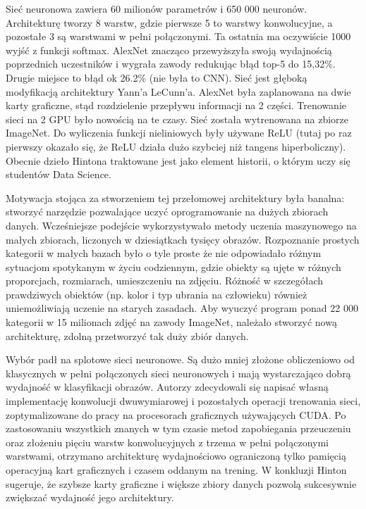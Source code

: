 \documentclass[12pt,a4paper,twoside,titlepage,openright]{book}
\begin{document}
\begin{itemize}
\begin{itemize}
 Sieć neuronowa zawiera 60 milionów parametrów i 650 000 neuronów. Architekturę tworzy 8 warstw, gdzie pierwsze 5 to warstwy konwolucyjne, a pozostałe 3 są warstwami w pełni połączonymi. Ta ostatnia ma oczywiście 1000 wyjść z funkcji softmax. AlexNet znacząco przewyższyła swoją wydajnością poprzednich uczestników i wygrała zawody redukując błąd top-5 do 15,32\%. Drugie miejsce to błąd ok 26.2\% (nie była to CNN). Sieć jest głęboką modyfikacją architektury Yann’a LeCunn’a. AlexNet była zaplanowana na dwie karty graficzne, stąd rozdzielenie przepływu informacji na 2 części. Trenowanie sieci na 2 GPU było nowością na te czasy. Sieć została wytrenowana na zbiorze ImageNet. Do wyliczenia funkcji nieliniowych były używane ReLU (tutaj po raz pierwszy okazało się, że ReLU działa dużo szybciej niż tangens hiperboliczny). Obecnie dzieło Hintona traktowane jest jako element historii, o którym uczy się studentów Data Science.
 
 Motywacja stojąca za stworzeniem tej przełomowej architektury była banalna: stworzyć narzędzie pozwalające uczyć oprogramowanie na dużych zbiorach danych.
 Wcześniejsze podejście wykorzystywało metody uczenia maszynowego na małych zbiorach, liczonych w dziesiątkach tysięcy obrazów. Rozpoznanie prostych kategorii w małych bazach było o tyle proste że nie odpowiadało różnym sytuacjom spotykanym w życiu codziennym, gdzie obiekty są ujęte w różnych proporcjach, rozmiarach, umieszczeniu na zdjęciu. Różność w szczegółach prawdziwych obiektów (np. kolor i typ ubrania na człowieku) również uniemożliwiają uczenie na starych zasadach. Aby wyuczyć program ponad 22 000 kategorii w 15 milionach zdjęć na zawody ImageNet, należało stworzyć nową architekturę, zdolną przetworzyć tak duży zbiór danych.
 
 Wybór padł na splotowe sieci neuronowe. Są dużo mniej złożone obliczeniowo od klasycznych w pełni połączonych sieci neuronowych i mają wystarczająco dobrą wydajność w klasyfikacji obrazów. Autorzy zdecydowali się napisać własną implementację konwolucji dwuwymiarowej i pozostałych operacji trenowania sieci, zoptymalizowane do pracy na procesorach graficznych używających CUDA. Po zastosowaniu wszystkich znanych w tym czasie metod zapobiegania przeuczeniu oraz złożeniu pięciu warstw konwolucyjnych z trzema w pełni połączonymi warstwami, otrzymano architekturę wydajnościowo ograniczoną tylko pamięcią operacyjną kart graficznych i czasem oddanym na trening. W konkluzji Hinton sugeruje, że szybsze karty graficzne i większe zbiory danych pozwolą sukcesywnie zwiększać wydajność jego architektury.
 

\end{itemize}
\end{itemize}
\end{document}
